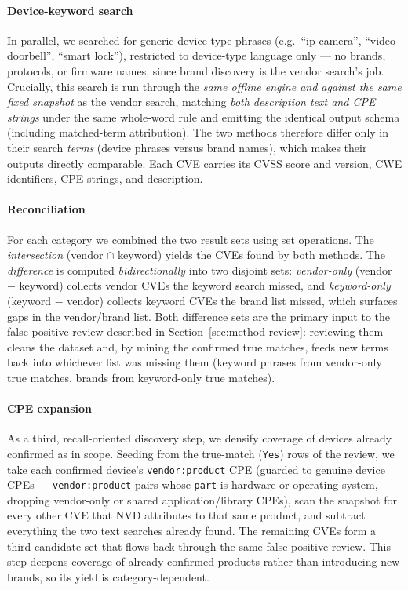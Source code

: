 \documentclass[conference]{IEEEtran}
\begin{document}
\paragraph{Device-keyword search} In parallel, we searched for generic device-type
phrases (e.g.\ ``ip camera'', ``video doorbell'', ``smart lock''), restricted to
device-type language only --- no brands, protocols, or firmware names, since brand
discovery is the vendor search's job. Crucially, this search is run through the
\emph{same offline engine and against the same fixed snapshot} as the vendor
search, matching \emph{both description text and CPE strings} under the same
whole-word rule and emitting the identical output schema (including matched-term
attribution). The two methods therefore differ only in their search \emph{terms}
(device phrases versus brand names), which makes their outputs directly comparable.
Each CVE carries its CVSS score and version, CWE identifiers, CPE strings, and
description.

\paragraph{Reconciliation} For each category we combined the two result sets
using set operations. The \emph{intersection} (vendor $\cap$ keyword) yields the
CVEs found by both methods. The \emph{difference} is computed \emph{bidirectionally}
into two disjoint sets: \emph{vendor-only} (vendor $-$ keyword) collects vendor CVEs
the keyword search missed, and \emph{keyword-only} (keyword $-$ vendor) collects
keyword CVEs the brand list missed, which surfaces gaps in the vendor/brand list.
Both difference sets are the primary input to the false-positive review described in
Section~\ref{sec:method-review}: reviewing them cleans the dataset and, by mining the
confirmed true matches, feeds new terms back into whichever list was missing them
(keyword phrases from vendor-only true matches, brands from keyword-only true
matches).

\paragraph{CPE expansion} As a third, recall-oriented discovery step, we densify
coverage of devices already confirmed as in scope. Seeding from the true-match
(\texttt{Yes}) rows of the review, we take each confirmed device's
\texttt{vendor:product} CPE (guarded to genuine device CPEs --- \texttt{vendor:product}
pairs whose \texttt{part} is hardware or operating system, dropping vendor-only or
shared application/library CPEs), scan the snapshot for every other CVE that NVD
attributes to that same product, and subtract everything the two text searches
already found. The remaining CVEs form a third candidate set that flows back through
the same false-positive review. This step deepens coverage of already-confirmed
products rather than introducing new brands, so its yield is category-dependent.
\end{document}
